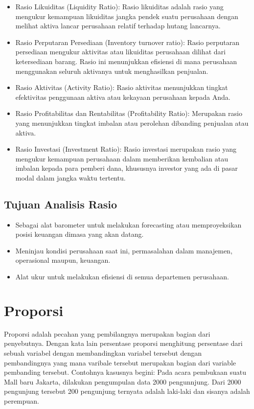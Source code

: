 \documentclass[
]{book}
\providecommand{\tightlist}{%
  \setlength{\itemsep}{0pt}\setlength{\parskip}{0pt}}
\begin{document}
\begin{itemize}
\tightlist
\item
  Rasio Likuiditas (Liquidity Ratio): Rasio likuiditas adalah rasio yang mengukur kemampuan likuiditas jangka pendek suatu perusahaan dengan melihat aktiva lancar perusahaan relatif terhadap hutang lancarnya.
\item
  Rasio Perputaran Persediaan (Inventory turnover ratio): Rasio perputaran persediaan mengukur aktivitas atau likuiditas perusahaan dilihat dari ketersediaan barang. Rasio ini menunjukkan efisiensi di mana perusahaan menggunakan seluruh aktivanya untuk menghasilkan penjualan.
\item
  Rasio Aktivitas (Activity Ratio): Rasio aktivitas menunjukkan tingkat efektivitas penggunaan aktiva atau kekayaan perusahaan kepada Anda.
\item
  Rasio Profitabilitas dan Rentabilitas (Profitability Ratio): Merupakan rasio yang menunjukkan tingkat imbalan atau perolehan dibanding penjualan atau aktiva.
\item
  Rasio Investasi (Investment Ratio): Rasio investasi merupakan rasio yang mengukur kemampuan perusahaan dalam memberikan kembalian atau imbalan kepada para pemberi dana, khususnya investor yang ada di pasar modal dalam jangka waktu tertentu.
\end{itemize}

\hypertarget{tujuan-analisis-rasio}{%
\subsection{Tujuan Analisis Rasio}\label{tujuan-analisis-rasio}}

\begin{itemize}
\tightlist
\item
  Sebagai alat barometer untuk melakukan forecasting atau memproyeksikan posisi keuangan dimasa yang akan datang.
\item
  Meninjau kondisi perusahaan saat ini, permasalahan dalam manajemen, operasional maupun, keuangan.
\item
  Alat ukur untuk melakukan efisiensi di semua departemen perusahaan.
\end{itemize}

\hypertarget{proporsi}{%
\section{Proporsi}\label{proporsi}}

Proporsi adalah pecahan yang pembilangnya merupakan bagian dari penyebutnya. Dengan kata lain persentase proporsi menghitung persentase dari sebuah variabel dengan membandingkan variabel tersebut dengan pembandingnya yang mana varibale tersebut merupakan bagian dari variable pembanding tersebut. Contohnya kasusnya begini: Pada acara pembukaan suatu Mall baru Jakarta, dilakukan pengumpulan data 2000 pengunnjung. Dari 2000 pengunjung tersebut 200 pengunjung ternyata adalah laki-laki dan sisanya adalah perempuan.
\end{document}
